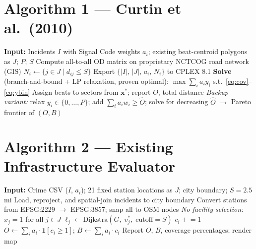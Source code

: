 \documentclass[12pt]{article}
\begin{document}
\section{Algorithm 1 — Curtin et al.\ (2010)}

\begin{algorithm}[H]
\caption{Classical PPAC --- Curtin, Hayslett-McCall \& Qiu (2010)}
\begin{algorithmic}[1]
\State \textbf{Input:} Incidents $I$ with Signal Code weights $a_i$;
       existing beat-centroid polygons as $J$; $P$; $S$
\State Compute all-to-all OD matrix on proprietary NCTCOG road network (GIS)
    \State $N_i \leftarrow \{j \in J \mid d_{ij} \le S\}$
\EndFor
\State Export $\{|I|,\, |J|,\, a_i,\, N_i\}$ to CPLEX 8.1
\State \textbf{Solve} (branch-and-bound + LP relaxation, proven optimal):
    \Statex \quad $\max \sum_{i} a_i y_i$ \; s.t.\ \eqref{eq:cov}--\eqref{eq:ybin}
\State Assign beats to sectors from $\mathbf{x}^*$; report $O$, total distance
\State \textit{Backup variant:} relax $y_i \in \{0,\dots,P\}$;
       add $\sum_i a_i w_i \ge \hat{O}$;
       solve for decreasing $\hat{O}$ $\to$ Pareto frontier of $(O,B)$
\end{algorithmic}
\end{algorithm}

\section{Algorithm 2 — Existing Infrastructure Evaluator}

\begin{algorithm}[H]
\caption{Existing LAPD Station Coverage Evaluator}
\begin{algorithmic}[1]
\State \textbf{Input:} Crime CSV ($I$, $a_i$); 21 fixed station locations as $J$;
       city boundary; $S = 2.5$ mi
\State Load, reproject, and spatial-join incidents to city boundary
\State Convert stations from EPSG:2229 $\to$ EPSG:3857; snap all to OSM nodes
\State \textit{No facility selection:} $x_j = 1$ for all $j \in J$
    \State $\ell_j \leftarrow \text{Dijkstra}(G,\; v^*_j,\; \text{cutoff}=S)$
        \State $c_i \mathrel{+}= 1$
    \EndFor
\EndFor
\State $O \leftarrow \sum_i a_i \cdot \mathbf{1}[c_i \ge 1]$;\quad
       $B \leftarrow \sum_i a_i \cdot c_i$
\State Report $O$, $B$, coverage percentages; render map
\end{algorithmic}
\end{algorithm}
\end{document}
